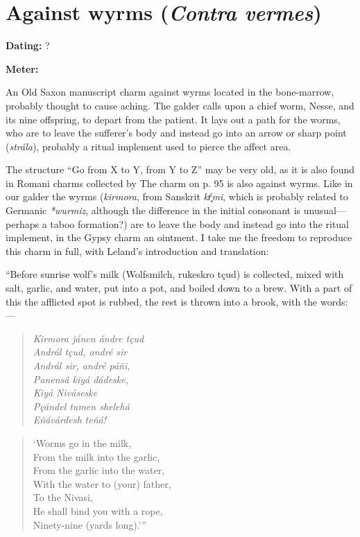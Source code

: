 \section{Against wyrms (\emph{Contra vermes})}\chapterStart{}

\begin{flushright}%
\textbf{Dating:} ?

\textbf{Meter:} \Fornyrdislag%
\end{flushright}%

An Old Saxon manuscript charm against wyrms located in the bone-marrow, probably thought to cause aching.  The galder calls upon a chief worm, Nesse, and its nine offspring, to depart from the patient.  It lays out a path for the worms, who are to leave the sufferer’s body and instead go into an arrow or sharp point (\emph{strála}), probably a ritual implement used to pierce the affect area.

The structure “Go from X to Y, from Y to Z” may be very old, as it is also found in Romani charms collected by \textcite[27,28,95]{Leland1891}  The charm on p. 95 is also against wyrms.  Like in our galder the wyrms (\emph{kirmora}, from Sanskrit \emph{kŕ̥mi}, which is probably related to Germanic \emph{*wurmiz}, although the difference in the initial consonant is unusual—perhaps a taboo formation?) are to leave the body and instead go into the ritual implement, in the Gypsy charm an ointment.  I take me the freedom to reproduce this charm in full, with Leland’s introduction and translation:

“Before sunrise wolf’s milk (Wolfsmilch, rukeskro tçud) is collected, mixed with salt, garlic, and water, put into a pot, and boiled down to a brew. With a part of this the afflicted spot is rubbed, the rest is thrown into a brook, with the words:—

\begin{verse}
\emph{Kirmora jánen ándre tçud} \\
\emph{Andrál tçud, andré sir} \\
\emph{Andrál sir, andré páñi,} \\
\emph{Panensá kiyá dádeske,} \\
\emph{Kiyá Niváseske} \\
\emph{Pçándel tumen shelehá} \\
\emph{Eñávárdesh teñá!}
\end{verse}

\begin{verse}
‘Worms go in the milk, \\
From the milk into the garlic, \\
From the garlic into the water, \\
With the water to (your) father, \\
To the Nivasi, \\
He shall bind you with a rope, \\
Ninety-nine (yards long).’”
\end{verse}


